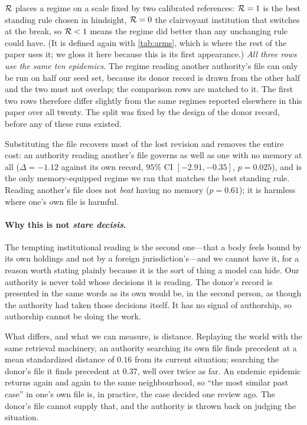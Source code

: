 \documentclass[11pt]{article}
\begin{document}
\noindent\footnotesize $\mathcal{R}$ places a regime on a scale fixed by two calibrated references:
$\mathcal{R}=1$ is the best standing rule chosen in hindsight, $\mathcal{R}=0$ the clairvoyant institution that
switches at the break, so $\mathcal{R}<1$ means the regime did better than any unchanging rule could have.
(It is defined again with \cref{tab:arms}, which is where the rest of the paper uses it; we gloss it
here because this is its first appearance.) \emph{All three rows use the same ten epidemics.} The regime reading another
authority's file can only be run on half our seed set, because its donor record is drawn from the
other half and the two must not overlap; the comparison rows are matched to it. The first two rows
therefore differ slightly from the same regimes reported elsewhere in this paper over all twenty.
The split was fixed by the design of the donor record, before any of these runs
existed.\normalsize

Substituting the file recovers most of the lost revision and removes the entire cost: an authority
reading another's file governs as well as one with no memory at all ($\Delta = -1.12$ against its own
record, $95\%$ CI $[-2.91, -0.35]$, $p = 0.025$), and is the only memory-equipped regime we ran that
matches the best standing rule. Reading another's file does not \emph{beat} having no memory
($p = 0.61$); it is harmless where one's own file is harmful.

\paragraph{Why this is not \emph{stare decisis}.} The tempting institutional reading is the second
one---that a body feels bound by its own holdings and not by a foreign jurisdiction's---and we cannot
have it, for a reason worth stating plainly because it is the sort of thing a model can hide. Our
authority is never told whose decisions it is reading. The donor's record is presented in the same
words as its own would be, in the second person, as though the authority had taken those decisions
itself. It has no signal of authorship, so authorship cannot be doing the work.

What differs, and what we can measure, is distance. Replaying the world with the same retrieval
machinery, an authority searching its own file finds precedent at a mean standardized distance of
$0.16$ from its current situation; searching the donor's file it finds precedent at $0.37$, well over
twice as far. An endemic epidemic returns again and again to the same neighbourhood, so ``the most
similar past case'' in one's own file is, in practice, the case decided one review ago. The donor's
file cannot supply that, and the authority is thrown back on judging the situation.
\end{document}
